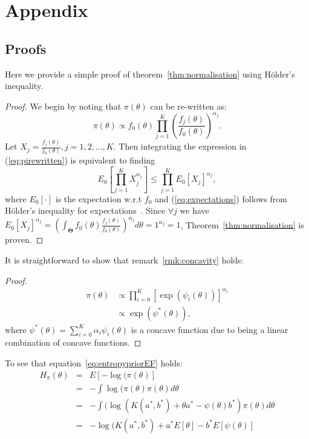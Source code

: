 \documentclass[a4paper, notitlepage, 11pt]{article}
\begin{document}
\section*{Appendix}

\subsection*{Proofs}

Here we provide a simple proof of theorem~\ref{thm:normalisation} using H\"{o}lder's inequality.
\begin{proof}
We begin by noting that $\pi(\theta)$ can be re-written as:
\begin{equation}
\label{eq:pirewritten}
 \pi(\theta) \propto f_0(\theta)\prod_{j=1}^{K} \left(\frac{f_j(\theta)}{f_0(\theta)}\right)^{\alpha_j}.
\end{equation}
Let $X_j = \frac{f_j(\theta)}{f_0(\theta)}, j=1, 2,\ldots, K$. 
Then integrating the expression in (\ref{eq:pirewritten}) is equivalent to finding 
\begin{equation}
\label{eq:expectations}
E_{0}\left[\prod_{j=1}^KX_j^{\alpha_j}\right] \leq \prod_{j=1}^KE_{0}[X_j]^{\alpha_j},
\end{equation}
where $E_{0}[\cdot]$ is the expectation w.r.t $f_0$ and (\ref{eq:expectations}) follows from H\"{o}lder's inequality for expectations~\citep{yeh2011}.
Since $\forall j$ we have $E_{0}[X_j]^{\alpha_j} = \left(\int_{\boldsymbol\Theta}f_0(\theta)\frac{f_j(\theta)}{f_0(\theta)}\right)^{\alpha_j}d\theta=1^{\alpha_j}=1$, Theorem~\ref{thm:normalisation} is proven.
\end{proof}
It is straightforward to show that remark~\ref{rmk:concavity} holds:
\begin{proof}
\begin{align}
 \pi(\theta) &\propto \prod_{i=0}^{K} [\exp(\psi_i(\theta))]^{\alpha_i}\\
             &\propto \exp(\psi^{\ast}(\theta)),
\end{align}
 where $\psi^{\ast}(\theta) = \sum_{i=0}^{K}\alpha_i\psi_i(\theta)$ is a concave function due to being a linear combination of concave functions.
\end{proof}
To see that equation~\ref{eq:entropypriorEF} holds:
\begin{eqnarray*} 
H_\pi(\theta) & = & E[-\log(\pi(\theta)] \\
              & = & - \int \log(\pi(\theta) \pi(\theta) d\theta \\
              & = & - \int (\log(K(a^*, b^*) + \theta a^* - \psi(\theta) b^*) \pi(\theta) d\theta \\
              & = & - \log(K(a^*, b^*) + a^*  E[\theta]-  b^*  E[\psi(\theta)]
\end{eqnarray*}
\end{document}
